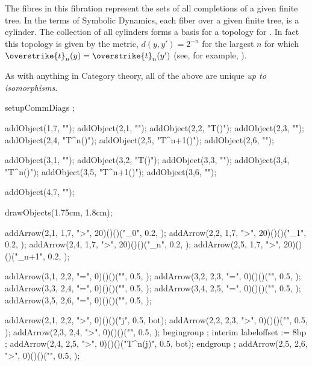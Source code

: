 The fibres in this fibration represent the sets of all completions of a 
given finite tree. In the terms of Symbolic Dynamics, each fiber over a 
given finite tree, is a cylinder. The collection of all cylinders forms a 
basis for a topology for \lol. In fact this topology is given by the 
metric, $d(y, y') = 2^{-n}$ for the largest $n$ for which 
$\overstrike{t}_n(y) = \overstrike{t}_n(y')$ (see, for example, 
\cite{barr1993terminalCoalgebrasWellFounded}). 

\stopitemize

\noindent As with anything in Category theory, all of the above are unique 
\emph{up to isomorphisms}. 

\item {}

\stopitemize
\placeformula[left]\startformula {}
  setupCommDiags ; 
  
  addObject(1,7, "\wflol");
  addObject(2,1, "\emptySet");
  addObject(2,2, "T(\emptySet)");
  addObject(2,3, "\cdots");
  addObject(2,4, "T^n(\emptySet)");
  addObject(2,5, "T^{n+1}(\emptySet)");
  addObject(2,6, "\cdots");
  
  addObject(3,1, "");
  addObject(3,2, "T()");
  addObject(3,3, "\cdots");
  addObject(3,4, "T^n()");
  addObject(3,5, "T^{n+1}()");
  addObject(3,6, "\cdots");
  
  addObject(4,7, "\lol");

  drawObjects(1.75cm, 1.8cm);

  addArrow(2,1, 1,7, ">", 20)()()("_0",     0.2, );
  addArrow(2,2, 1,7, ">", 20)()()("_1",     0.2, );
  addArrow(2,4, 1,7, ">", 20)()()("_n",     0.2, );
  addArrow(2,5, 1,7, ">", 20)()()("_{n+1}", 0.2, );
  
  addArrow(3,1, 2,2, "=", 0)()()("",           0.5, );
  addArrow(3,2, 2,3, "=", 0)()()("",           0.5, );
  addArrow(3,3, 2,4, "=", 0)()()("",           0.5, );
  addArrow(3,4, 2,5, "=", 0)()()("",           0.5, );
  addArrow(3,5, 2,6, "=", 0)()()("",           0.5, );

  addArrow(2,1, 2,2, ">", 0)()()("j",          0.5, bot);
  addArrow(2,2, 2,3, ">", 0)()()("",           0.5, );
  addArrow(2,3, 2,4, ">", 0)()()("",           0.5, );
  begingroup ;  interim labeloffset := 8bp ;
  addArrow(2,4, 2,5, ">", 0)()()("T^n(j)",     0.5, bot);
  endgroup ; 
  addArrow(2,5, 2,6, ">", 0)()()("",           0.5, );

